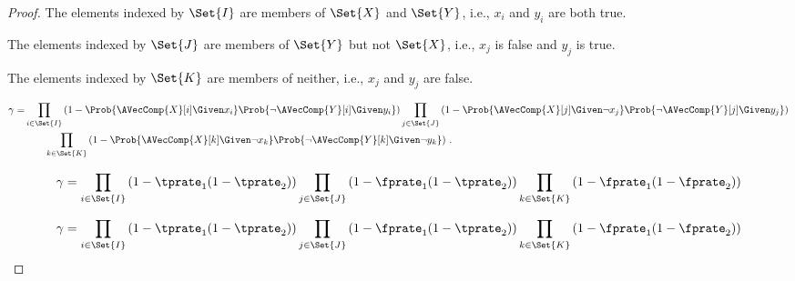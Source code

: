 \begin{proof}
    The elements indexed by $\Set{I}$ are members of $\Set{X}$ and $\Set{Y}$, i.e.,
    $x_i$ and $y_i$ are both true.
    
    The elements indexed by $\Set{J}$ are members of $\Set{Y}$ but not $\Set{X}$,
    i.e., $x_j$ is false and $y_j$ is true.
    
    The elements indexed by $\Set{K}$ are members of neither, i.e., $x_j$ and $y_j$
    are false.
    
    
    \begin{equation}
    \begin{split}
    \gamma =
        &\prod_{i \in \Set{I}}
            \left(1-\Prob{\AVecComp{X}[i] \Given x_i}
            \Prob{\neg \AVecComp{Y}[i] \Given y_i}\right)
        \prod_{j \in \Set{J}}
            \left(1-\Prob{\AVecComp{X}[j] \Given \neg x_j}
            \Prob{\neg \AVecComp{Y}[j] \Given y_j}\right)\\
        &\qquad \prod_{k \in \Set{K}}
            \left(1-\Prob{\AVecComp{X}[k] \Given \neg x_k}
            \Prob{\neg \AVecComp{Y}[k] \Given \neg y_k}\right)\,.  
    \end{split}    
    \end{equation}
    
    
    
    \begin{equation}
    \gamma =
        \prod_{i \in \Set{I}}
            \left(1 - \tprate_1
            (1 - \tprate_2)\right)
        \prod_{j \in \Set{J}}
            \left(1 - \fprate_1
            (1 - \tprate_2)\right)
        \prod_{k \in \Set{K}}
            \left(1 - \fprate_1
            (1 - \fprate_2)\right)
    \end{equation}
    
    
    
    \begin{equation}
    \gamma =
    \prod_{i \in \Set{I}}
    \left(1 - \tprate_1
    (1 - \tprate_2)\right)
    \prod_{j \in \Set{J}}
    \left(1 - \fprate_1
    (1 - \tprate_2)\right)
    \prod_{k \in \Set{K}}
    \left(1 - \fprate_1
    (1 - \fprate_2)\right)
    \end{equation}
    
    
    

\end{proof}
